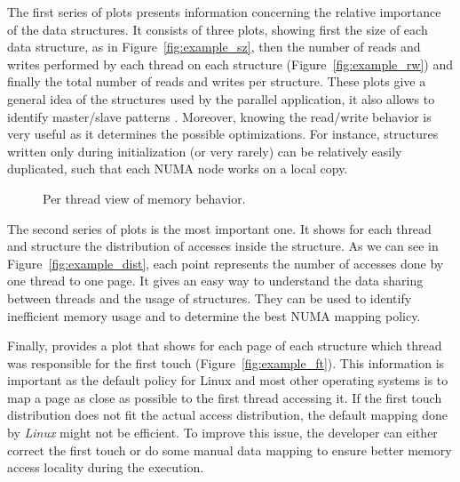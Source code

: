 The first series of plots presents information concerning the relative
importance of the data structures. It consists of three plots, showing first the
size of each data structure, as in Figure~\ref{fig:example_sz}, then the
number of reads and writes performed by each thread on each structure (Figure~\ref{fig:example_rw}) and
finally the total number of reads and writes per structure. These plots give a
general idea of the structures used by the parallel application, it also allows to identify
master/slave patterns .  Moreover, knowing the read/write behavior is very
useful as it determines the possible optimizations. For instance, structures
written only during initialization (or very rarely) can be relatively easily
duplicated, such that each NUMA node works on a local copy.

\begin{figure}[htb]
    \centering
    \caption{Per thread view of memory behavior.}
    \label{fig:example_plot2}
\end{figure}

The second series of plots is the most important one. It shows for each thread
and structure the distribution of accesses inside the structure. As we
can see in Figure~\ref{fig:example_dist}, each point represents the number of
accesses done by one thread to one page. It gives an easy way to understand the data
sharing between threads and the usage of structures. They can be used to identify
inefficient memory usage and to determine the best NUMA mapping policy.



Finally, \TABARNAC provides a plot that shows for each page of each structure
which thread was responsible for the first touch
(Figure~\ref{fig:example_ft}). This information is important as the
default policy for Linux and most other operating systems is to map a page as close as possible to the first
thread accessing it. If the first touch distribution does not fit the actual
access distribution, the default mapping done by \emph{Linux} might not be
efficient. To improve this issue, the developer can either correct the first
touch or do some manual data mapping to ensure better memory access locality
during the execution.
